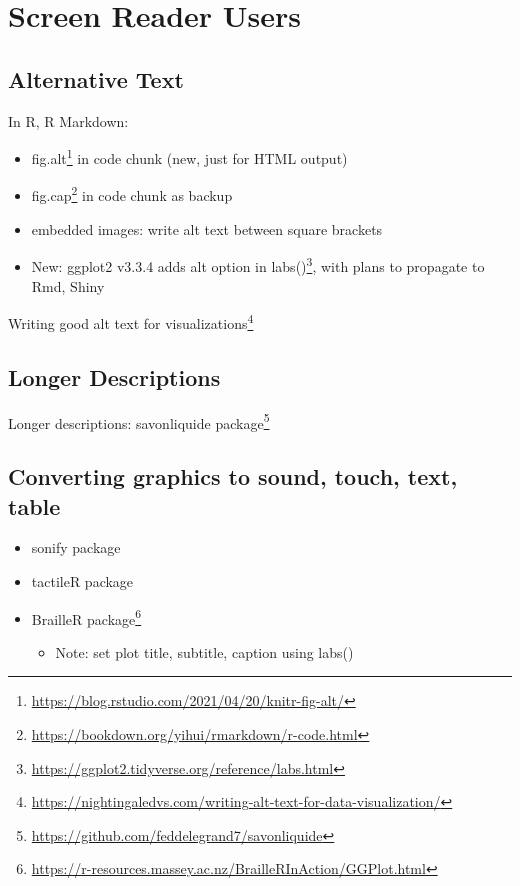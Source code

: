 \documentclass[
]{krantz}
\providecommand{\tightlist}{%
  \setlength{\itemsep}{0pt}\setlength{\parskip}{0pt}}
\renewcommand{\href}[2]{#2\footnote{\url{#1}}}
\begin{document}
\hypertarget{screen-reader-users}{%
\section{Screen Reader Users}\label{screen-reader-users}}

\hypertarget{alternative-text}{%
\subsection{Alternative Text}\label{alternative-text}}

In R, R Markdown:

\begin{itemize}
\item
  \href{https://blog.rstudio.com/2021/04/20/knitr-fig-alt/}{fig.alt} in code chunk (new, just for HTML output)
\item
  \href{https://bookdown.org/yihui/rmarkdown/r-code.html}{fig.cap} in code chunk as backup
\item
  embedded images: write alt text between square brackets
\item
  New: ggplot2 v3.3.4 adds \href{https://ggplot2.tidyverse.org/reference/labs.html}{alt option in labs()}, with plans to propagate to Rmd, Shiny
\end{itemize}

\href{https://nightingaledvs.com/writing-alt-text-for-data-visualization/}{Writing good alt text for visualizations}

\hypertarget{longer-descriptions}{%
\subsection{Longer Descriptions}\label{longer-descriptions}}

Longer descriptions: \href{https://github.com/feddelegrand7/savonliquide}{savonliquide package}

\hypertarget{converting-graphics-to-sound-touch-text-table}{%
\subsection{Converting graphics to sound, touch, text, table}\label{converting-graphics-to-sound-touch-text-table}}

\begin{itemize}
\item
  sonify package
\item
  tactileR package
\item
  \href{https://r-resources.massey.ac.nz/BrailleRInAction/GGPlot.html}{BrailleR package}

  \begin{itemize}
  \tightlist
  \item
    Note: set plot title, subtitle, caption using labs()
  \end{itemize}
\end{itemize}
\end{document}
